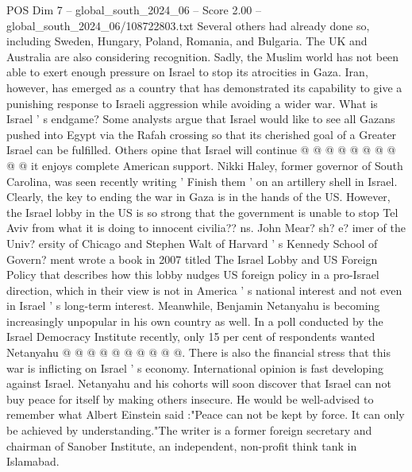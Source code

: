 \begin{textsample}{POS Dim 7 – global\_south\_2024\_06 – Score 2.00 – global\_south\_2024\_06/108722803.txt}
Several others had already done so, including Sweden, Hungary, Poland, Romania, and Bulgaria.
The UK and Australia are also considering recognition.
Sadly, the Muslim world has not been able to exert enough pressure on Israel to stop its atrocities in Gaza.
Iran, however, has emerged as a country that has demonstrated its capability to give a punishing response to Israeli aggression while avoiding a wider war.
What is Israel ' s endgame?
Some analysts argue that Israel would like to see all Gazans pushed into Egypt via the Rafah crossing so that its cherished goal of a Greater Israel can be fulfilled.
Others opine that Israel will continue @ @ @ @ @ @ @ @ @ @ it enjoys complete American support.
Nikki Haley, former governor of South Carolina, was seen recently writing ' Finish them ' on an artillery shell in Israel.
Clearly, the key to ending the war in Gaza is in the hands of the US.
However, the Israel lobby in the US is so strong that the government is unable to stop Tel Aviv from what it is doing to innocent civilia?? ns.
John Mear? sh? e? imer of the Univ? ersity of Chicago and Stephen Walt of Harvard ' s Kennedy School of Govern? ment wrote a book in 2007 titled The Israel Lobby and US Foreign Policy that describes how this lobby nudges US foreign policy in a pro-Israel direction, which in their view is not in America ' s national interest and not even in Israel ' s long-term interest.
Meanwhile, Benjamin Netanyahu is becoming increasingly unpopular in his own country as well.
In a poll conducted by the Israel Democracy Institute recently, only 15 per cent of respondents wanted Netanyahu @ @ @ @ @ @ @ @ @ @.
There is also the financial stress that this war is inflicting on Israel ' s economy.
International opinion is fast developing against Israel.
Netanyahu and his cohorts will soon discover that Israel can not buy peace for itself by making others insecure.
He would be well-advised to remember what Albert Einstein said :"Peace can not be kept by force.
It can only be achieved by understanding."The writer is a former foreign secretary and chairman of Sanober Institute, an independent, non-profit think tank in Islamabad.

\end{textsample}
